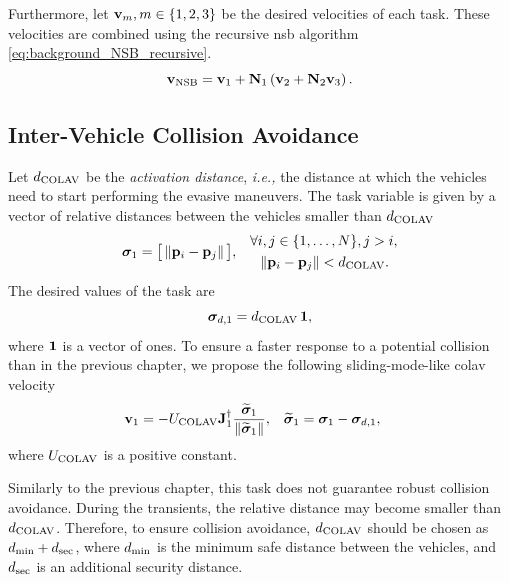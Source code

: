 Furthermore, let $\mathbf{v}_{m}, m \in \left\{1,2,3\right\}$ be the desired velocities of each task.    
These velocities are combined using the recursive \gls{nsb} algorithm \eqref{eq:background_NSB_recursive}.
\begin{equation} 
    \mathbf{v}_{\rm NSB} = \mathbf{v}_1 + \mathbf{N}_1\left(\mathbf{v}_2 + \mathbf{N}_2\mathbf{v}_3\right). \label{eq:NSB_R_NSB_with_COLAV}
\end{equation}

\subsection{Inter-Vehicle Collision Avoidance}
\label{sec:NSB_R_COLAV}

Let {$d_{\rm COLAV}$} be the \emph{activation distance}, \emph{i.e.,} the distance at which the vehicles need to start performing the evasive maneuvers.
The task variable is given by a vector of relative distances between the vehicles smaller than $d_{\rm COLAV}$
\begin{align}
        \bm{\sigma}_1 &= \big[\left\|\mathbf{p}_i - \mathbf{p}_j\right\|\big], &
        \begin{split} 
            \forall &i,j\in\{1,\ldots,N\}, j > i, \\
            &\left\|\mathbf{p}_i - \mathbf{p}_j\right\| < d_{\rm COLAV}.
        \end{split}
\end{align}
The desired values of the task are 
\begin{equation}
    \bm{\sigma}_{d,1} = d_{\rm COLAV} \, \mathbf{1},
\end{equation}
where $\mathbf{1}$ is a vector of ones.
To ensure a faster response to a potential collision than in the previous chapter, we propose the following sliding-mode-like \gls{colav} velocity 
\begin{align}
    \mathbf{v}_1 &= - U_{\rm COLAV} \mathbf{J}_1^{\dagger} \frac{\widetilde{\bm{\sigma}}_1}{\left\|\widetilde{\bm{\sigma}}_1\right\|}, &
    \widetilde{\bm{\sigma}}_1 &= \bm{\sigma}_1 - \bm{\sigma}_{d, 1},
\end{align}
where $U_{\rm COLAV}$ is a positive constant.

Similarly to the previous chapter, this task does not guarantee robust collision avoidance.
During the transients, the relative distance may become smaller than $d_{\rm COLAV}$.
Therefore, to ensure collision avoidance, $d_{\rm COLAV}$ should be chosen as $d_{\rm min} + d_{\rm sec}$, where $d_{\rm min}$ is the minimum safe distance between the vehicles, and $d_{\rm sec}$ is an additional security distance.


